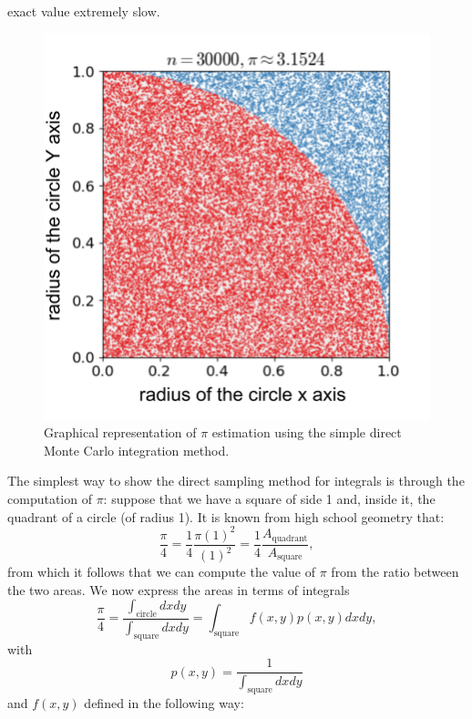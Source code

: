 exact value extremely slow.
\begin{figure}[H]
    \centering
    \includegraphics[scale=0.25]{Pi_MC.png}
    \caption{Graphical representation of $\pi$ estimation using the simple direct Monte Carlo integration method.}
    \label{fig:MC_pi_estimation}
\end{figure}
The simplest way to show the direct sampling method for integrals is through the computation of $\pi$: suppose that we have a square of side 1 and, inside it, 
the quadrant of a circle (of radius 1). It is known from high school geometry that:
\begin{equation}
    \frac{\pi}{4}=\frac{1}{4}\frac{\pi(1)^2}{(1)^2}=\frac{1}{4}\frac{A_{\text{quadrant}}}{A_{\text{square}}},
\end{equation}
from which it follows that we can compute the value of $\pi$ from the ratio between the two areas.
We now express the areas in terms of integrals
\begin{equation}
    \frac{\pi}{4}=\frac{\int_{\text{circle}}dxdy}{\int_{\text{square}}dxdy}=\int_{\text{square}}f(x,y)p(x,y)dxdy,
\end{equation}
with
\begin{equation}
    p(x,y)=\frac{1}{\int_{\text{square}}dxdy}
\end{equation}
and $f(x,y)$ defined in the following way:
